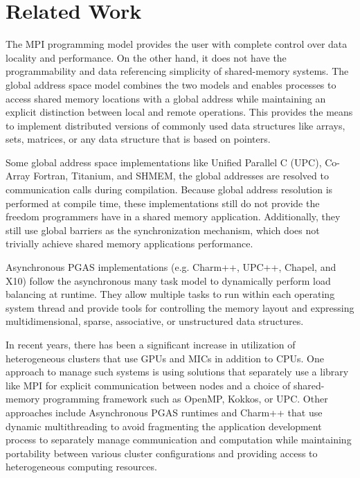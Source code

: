 \section{Related Work}
\label{related_work}

The MPI programming model provides the user with complete control over data
locality and performance. On the other hand, it does not have the
programmability and data referencing simplicity of shared-memory systems. The
global address space model combines the two models and enables processes to
access shared memory locations with a global address while maintaining an
explicit distinction between local and remote operations. This provides the
means to implement distributed versions of commonly used data structures like
arrays, sets, matrices, or any data structure that is based on pointers.

Some global address space implementations like Unified Parallel C (UPC)\cite{upc_org}, Co-Array
Fortran, Titanium\cite{yelick1998titanium}, and SHMEM\cite{shmem_feind1995,openshmem_chapman2010}, the global addresses are resolved to communication calls
during compilation. Because global address resolution is performed at compile
time, these implementations still do not provide the freedom programmers have
in a shared memory application. Additionally, they still use global barriers as
the synchronization mechanism, which does not trivially achieve shared memory
applications performance.

Asynchronous PGAS implementations (e.g. Charm++, UPC++, Chapel, and X10) follow
the asynchronous many task model to dynamically perform load balancing at
runtime. They allow multiple tasks to run within each operating system thread
and provide tools for controlling the memory layout and expressing
multidimensional, sparse, associative, or unstructured data structures.

In recent years, there has been a significant increase in utilization of
heterogeneous clusters that use GPUs and MICs in addition to
CPUs\cite{Lena2014,Yang2011266,Potluri2014,Sidelnik2011}. One approach to
manage such systems is using
solutions\cite{Rabenseifner2009,Yang2011266,Chorley2010} that separately use a
library like MPI for explicit communication between nodes and a choice of
shared-memory programming framework such as OpenMP\cite{openmp_org}, Kokkos\cite{kokkos_paper,kokkos_repo}, or
UPC. Other approaches include Asynchronous PGAS
runtimes\cite{Saraswat2010} and Charm++ that use dynamic
multithreading to avoid fragmenting the application development process to
separately manage communication and computation while maintaining portability
between various cluster configurations and providing access to heterogeneous
computing resources\cite{P0234R0}.

